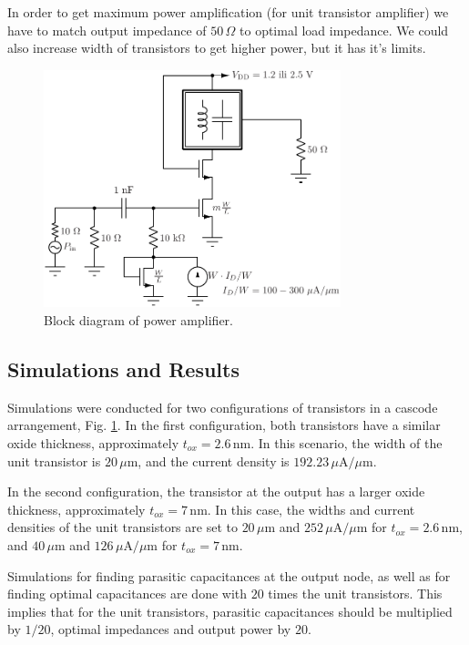 \documentclass[lettersize,journal]{IEEEtran}
\begin{document}
In order to get maximum power amplification (for unit transistor amplifier) we have to match output impedance of $50 \, \Omega$ to optimal load impedance. We could also increase width of transistors to get higher power, but it has it's limits.

\begin{figure}[!t]
\centering
\includegraphics[width=3.4in]{./fig/blockpa.pdf}
\caption{Block diagram of power amplifier.}
\label{fig:blockPA}
\end{figure}

\subsection{Simulations and Results}
Simulations were conducted for two configurations of transistors in a cascode arrangement, Fig. \ref{fig:blockPA}. In the first configuration, both transistors have a similar oxide thickness, approximately $t_{ox} = 2.6 \, \text{nm}$. In this scenario, the width of the unit transistor is $20 \, \mu \text{m}$, and the current density is $192.23 \, \mu \text{A/} \mu \text{m}$. 

In the second configuration, the transistor at the output has a larger oxide thickness, approximately $t_{ox} = 7 \, \text{nm}$. In this case, the widths and current densities of the unit transistors are set to $20 \, \mu \text{m}$ and $252 \, \mu \text{A/} \mu \text{m}$ for $t_{ox} = 2.6 \, \text{nm}$, and $40 \, \mu \text{m}$ and $126 \, \mu \text{A/} \mu \text{m}$ for $t_{ox} = 7 \, \text{nm}$.

Simulations for finding parasitic capacitances at the output node, as well as for finding optimal capacitances are done with $20$ times the unit transistors. This implies that for the unit transistors, parasitic capacitances should be multiplied by $1/20$, optimal impedances and output power by $20$. 
\end{document}
